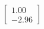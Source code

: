 \documentclass[preview]{standalone}
\begin{document}
\begin{align*}
\begin{bmatrix} 1.00 \\ -2.96 \end{bmatrix}
\end{align*}
\end{document}
